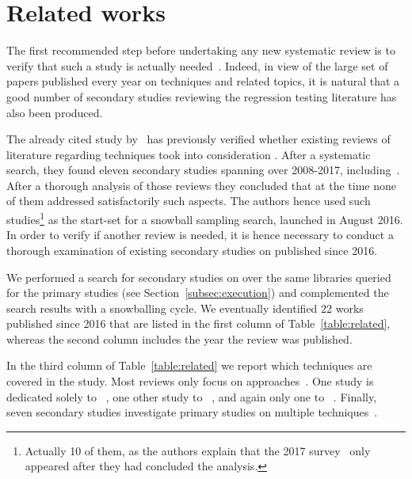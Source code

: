 \section{Related works}\label{sec:lit_related}

The first recommended step before undertaking any new systematic review is to verify that such a study is actually needed~\cite{kitchenham2004procedures}.
Indeed, in view of the large set of papers published every year on \rt techniques and related topics, it is natural that a good number of secondary studies reviewing the regression testing literature has also been produced.  

The already cited study by~\citet{bin_ali_search_2019} has previously verified whether existing reviews of literature regarding \rt techniques took into consideration \rea.
After a systematic search, they found eleven secondary studies spanning over 2008-2017, including~\cite{rosero_15_2016,felderer2015systematic,engstrom2010systematic,zarrad2015systematic,kazmi_effective_2017,harrold2008retesting,catal2012application,yoo2012regression,qiu2014regression,singh2012systematic,catal2013test}. After a thorough analysis of those reviews they concluded that at the time none of them addressed satisfactorily such aspects.
The authors hence used such studies\footnote{Actually 10 of them, as the authors explain that the 2017 survey~\cite{kazmi_effective_2017} only appeared after they had concluded the analysis.} as the start-set for a snowball sampling search, launched in August 2016.  
In order to verify if another review is needed, it is hence necessary to conduct a thorough examination of existing secondary studies on \rt published since 2016.

We performed a search for secondary studies on \rt over the same libraries queried for the primary studies (see Section~\ref{subsec:execution}) and complemented the search results with a snowballing cycle.
We eventually identified 
22 works published since 2016 that are listed in the first column of Table~\ref{table:related}, whereas the
second column includes the year the review was published.


%

In the third column of Table~\ref{table:related} we report which \rt techniques are covered in the study.
Most reviews only focus on \tcp approaches~\cite{hao_test-case_2016, mukherjee_survey_2018, lou_survey_2018, khatibsyarbini_test_2018, bajaj_systematic_2019, prado_lima_test_2020, hasnain_comprehensive_2020,abdul2021systematic,hasnain2021ontology,mohd2021model,samad2021regression,ahmed_value_2022}.
One study is dedicated solely to \tcs~\cite{kazmi_effective_2017}, one other study to \tsr~\cite{rehman_khan_systematic_2018}, and again only one to \tsa~\cite{danglot2019snowballing}.
Finally, seven secondary studies investigate primary studies on multiple \rt techniques~\cite{rosero_15_2016, do_recent_2016, bajaj_survey_2018, bin_ali_search_2019,sadri2022survey,rosero2021software,pan2022test}.

